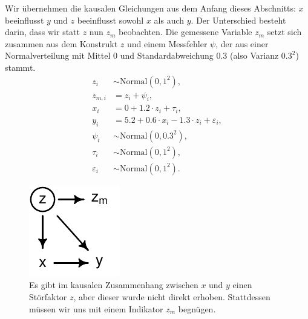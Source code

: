 \documentclass[oneside, 10pt]{book}\usepackage[]{graphicx}\usepackage[]{xcolor}
\newenvironment{knitrout}{}{} %
\begin{document}
Wir übernehmen die kausalen Gleichungen aus dem Anfang dieses
Abschnitts: $x$ beeinflusst $y$ und $z$ beeinflusst sowohl
$x$ als auch $y$. Der Unterschied besteht darin, dass wir
statt $z$ nun $z_m$ beobachten. Die gemessene Variable
$z_m$ setzt sich zusammen aus dem Konstrukt $z$
und einem Messfehler $\psi$, der aus einer Normalverteilung
mit Mittel 0 und Standardabweichung 0.3 (also Varianz $0.3^2$)
stammt.
\begin{align}
z_i &\sim \textrm{Normal}(0, 1^2), \nonumber \\
z_{m,i} &= z_i + \psi_i, \nonumber \\
x_i &= 0 + 1.2\cdot z_i + \tau_i, \nonumber \\
y_i &= 5.2 + 0.6\cdot x_i - 1.3 \cdot z_i + \varepsilon_i, \nonumber \\
\psi_i &\sim \textrm{Normal}(0, 0.3^2), \label{eq:dag1_aufgabe2}\\
\tau_i &\sim \textrm{Normal}(0, 1^2),  \nonumber \\
\varepsilon_i &\sim \textrm{Normal}(0, 1^2). \nonumber
\end{align}

\begin{knitrout}
\color{fgcolor}\begin{figure}[tp]

{\centering \includegraphics[width=.2\textwidth]{figs/unnamed-chunk-313-1} 

}

\caption{Es gibt im kausalen Zusammenhang zwischen $x$ und $y$ einen Störfaktor $z$, aber dieser wurde nicht direkt erhoben. Stattdessen müssen wir uns mit einem Indikator $z_m$ begnügen.\label{fig:dag1_aufgabe2}}\label{fig:unnamed-chunk-313}
\end{figure}

\end{knitrout}
\end{document}
